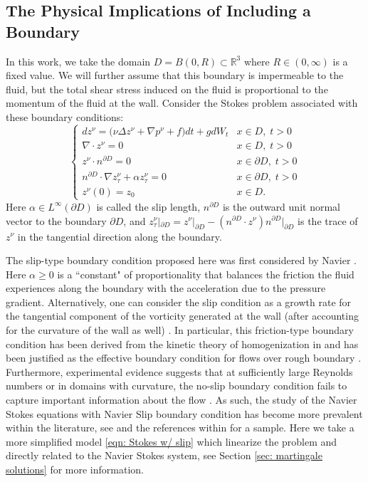 \documentclass[11pt, reqno]{article}
\def\R{{\mathbb R}} %
\def\grad{\nabla}
\begin{document}
\subsection{The Physical Implications of Including a Boundary}
In this work, we take the domain $D = B(0, R) \subset \R^3$ where $R \in (0, \infty)$ is a fixed value. We will further assume that this boundary is impermeable to the fluid, but the total shear stress induced on the fluid is proportional to the momentum of the fluid at the wall. Consider the Stokes problem associated with these boundary conditions:
\begin{equation}\label{eqn: Stokes w/ slip}
    \begin{cases}
        dz^\nu = \big(\nu \Delta z^\nu  + \grad p^\nu + f\big)dt + gdW_t & x \in D,\; t > 0\\
        \grad \cdot z^\nu = 0 & x \in D,\; t > 0\\
        z^\nu \cdot n^{\partial D} = 0 & x \in \partial D,\; t > 0\\
        n^{\partial D} \cdot \grad z_\tau^\nu + \alpha z_\tau^\nu = 0 &x \in \partial D,\; t > 0\\
        z^\nu(0) = z_0 & x \in D.
    \end{cases}
\end{equation}
Here $\alpha \in L^\infty(\partial D)$ is called the slip length, $n^{\partial D}$ is the outward unit normal vector to the boundary $\partial D$, and $z_\tau^\nu|_{\partial D} = z^\nu|_{\partial D} - (n^{\partial D} \cdot z^\nu)n^{\partial D}|_{\partial D}$ is the trace of $z^\nu$ in the tangential direction along the boundary. 

The slip-type boundary condition proposed here was first considered by Navier \cite{navier1822memoire}. Here $\alpha \geq 0$ is a ``constant" of proportionality that balances the friction the fluid experiences along the boundary with the acceleration due to the pressure gradient. Alternatively, one can consider the slip condition as a growth rate for the tangential component of the vorticity generated at the wall (after accounting for the curvature of the wall as well) \cite{chen2010study}. In particular, this friction-type boundary condition has been derived from the kinetic theory of homogenization in \cites{bardos2006half, coron1988classification} and has been justified as the effective boundary condition for flows over rough boundary \cites{gerard2010relevance, mikelic2000interface}. Furthermore, experimental evidence suggests that at sufficiently large Reynolds numbers or in domains with curvature, the no-slip boundary condition fails to capture important information about the flow \cites{zhu2002limits, einzel1990boundary, jager2003couette}. As such, the study of the Navier Stokes equations with Navier Slip boundary condition has become more prevalent within the literature, see \cites{chen2010study, neustupa2018regularity, xiao2007vanishing} and the references within for a sample. Here we take a more simplified model \eqref{eqn: Stokes w/ slip} which linearize the problem and directly related to the Navier Stokes system, see Section \ref{sec: martingale solutions} for more information. 
\end{document}
